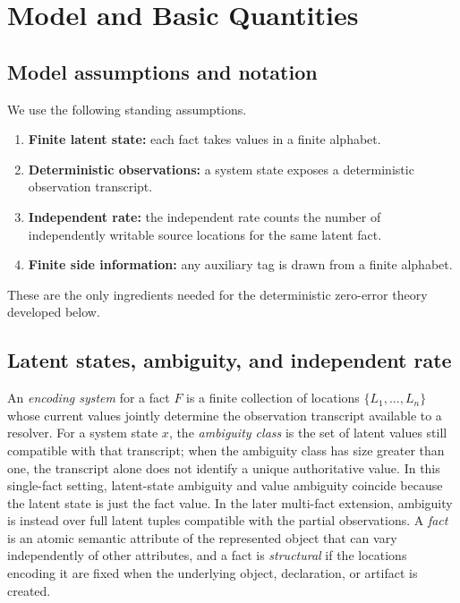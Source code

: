 \section{Model and Basic Quantities}\label{sec:foundations}

\subsection{Model assumptions and notation}\label{sec:assumptions}

We use the following standing assumptions.
\begin{enumerate}
\item \textbf{Finite latent state:} each fact takes values in a finite alphabet.
\item \textbf{Deterministic observations:} a system state exposes a deterministic observation transcript.
\item \textbf{Independent rate:} the independent rate counts the number of independently writable source locations for the same latent fact.
\item \textbf{Finite side information:} any auxiliary tag is drawn from a finite alphabet.
\end{enumerate}

These are the only ingredients needed for the deterministic zero-error theory developed below.

\subsection{Latent states, ambiguity, and independent rate}\label{sec:epistemic}

An \emph{encoding system} for a fact $F$ is a finite collection of locations $\{L_1,\dots,L_n\}$ whose current values jointly determine the observation transcript available to a resolver. For a system state $x$, the \emph{ambiguity class} is the set of latent values still compatible with that transcript; when the ambiguity class has size greater than one, the transcript alone does not identify a unique authoritative value. In this single-fact setting, latent-state ambiguity and value ambiguity coincide because the latent state is just the fact value. In the later multi-fact extension, ambiguity is instead over full latent tuples compatible with the partial observations. A \emph{fact} is an atomic semantic attribute of the represented object that can vary independently of other attributes, and a fact is \emph{structural} if the locations encoding it are fixed when the underlying object, declaration, or artifact is created.

